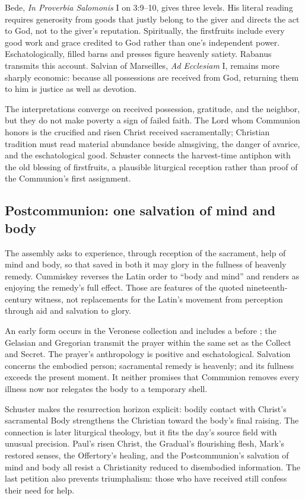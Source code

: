 Bede, \emph{In Proverbia Salomonis} I on 3:9--10, gives three levels. His
literal reading requires generosity from goods that justly belong to the giver
and directs the act to God, not to the giver's reputation. Spiritually, the firstfruits include
every good work and grace credited to God rather than one's independent
power. Eschatologically, filled barns and presses figure heavenly satiety.
Rabanus transmits this account. Salvian of Marseilles,
\emph{Ad Ecclesiam} I, remains more sharply economic: because all possessions
are received from God, returning them to him is justice as well as devotion.

The interpretations converge on received possession, gratitude, and the
neighbor, but they do not make poverty a sign of failed faith. The Lord whom
Communion honors is the crucified and risen Christ received sacramentally;
Christian tradition must read material abundance beside almsgiving, the
danger of avarice, and the eschatological good. Schuster connects the
harvest-time antiphon with the old blessing of firstfruits, a plausible
liturgical reception rather than proof of the Communion's first assignment.

\subsection*{Postcommunion: one salvation of mind and body\enspace{}}

The assembly asks to experience, through reception of the sacrament, help of
mind and body, so that saved in both it may glory in the fullness of heavenly
remedy. Cummiskey reverses the Latin order to ``body and mind'' and renders
 as enjoying the remedy's full effect. Those are
features of the quoted nineteenth-century witness, not replacements for the
Latin's movement from perception through aid and salvation to glory.

An early form occurs in the Veronese collection and includes a
 before ; the Gelasian and
Gregorian transmit the prayer within the same set as the Collect and Secret.
The prayer's anthropology is positive and eschatological. Salvation concerns
the embodied person; sacramental remedy is heavenly; and its fullness exceeds
the present moment. It neither promises that Communion removes every illness
now nor relegates the body to a temporary shell.

Schuster makes the resurrection horizon explicit: bodily contact with
Christ's sacramental Body strengthens the Christian toward the body's final
raising. The connection is later liturgical theology, but it fits the day's
source field with unusual precision. Paul's risen Christ, the Gradual's
flourishing flesh, Mark's restored senses, the Offertory's healing, and the
Postcommunion's salvation of mind and body all resist a Christianity reduced
to disembodied information. The last petition also prevents triumphalism:
those who have received still confess their need for help.
